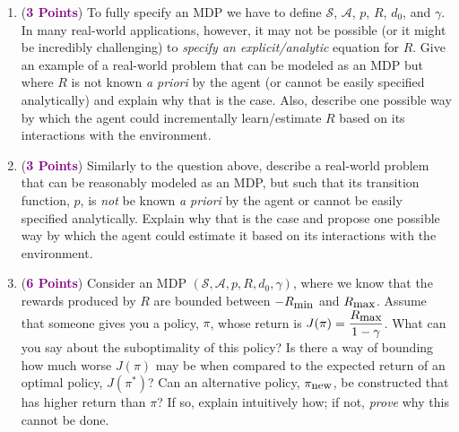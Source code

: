 \documentclass{article}
\newcommand{\POINTS}[1]{\textcolor{purple}{\textbf{{#1}}}}
\begin{document}
\begin{enumerate}
    \item (\POINTS{3 Points}) To fully specify an MDP we have to define $\mathcal S$, $\mathcal A$, $p$, $R$, $d_0$, and $\gamma$. In many real-world applications, however, it may not be possible (or it might be incredibly challenging) to \textit{specify an explicit/analytic} equation for $R$. Give an example of a real-world problem that can be modeled as an MDP but where $R$ is not known \textit{a priori} by the agent (or cannot be easily specified analytically) and explain why that is the case. Also, describe one possible way by which the agent could incrementally learn/estimate $R$ based on its interactions with the environment.
    \item (\POINTS{3 Points}) Similarly to the question above, describe a real-world problem that can be reasonably modeled as an MDP, but such that its transition function, $p$, is \emph{not} be known \textit{a priori} by the agent or cannot be easily specified analytically. Explain why that is the case and propose one possible way by which the agent could estimate it based on its interactions with the environment. 
    \item (\POINTS{6 Points}) Consider an MDP $(\mathcal S, \mathcal A, p, R, d_0, \gamma)$, where we know that the rewards produced by $R$ are bounded between $-R_{\mbox{\small{min}}}$ and $R_{\mbox{\small{max}}}$. Assume that someone gives you a policy, $\pi$, whose return is $J(\pi) = \dfrac{R_{\mbox{\small{max}}}}{1 - \gamma}$. What can you say about the suboptimality of this policy? Is there a way of bounding how much worse $J(\pi)$ may be when compared to the expected return of an optimal policy, $J(\pi^*)$? Can an alternative policy, $\pi_{\mbox{\small{new}}}$, be constructed that has higher return than $\pi$? If so, explain intuitively how; if not, \textit{prove} why this cannot be done.

\end{enumerate}
\end{document}
